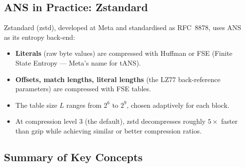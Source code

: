 \subsection{ANS in Practice: Zstandard}

Zstandard (zstd), developed at Meta and standardised as
RFC~8878, uses ANS as its entropy back-end:

\begin{itemize}[leftmargin=2em]
  \item \textbf{Literals} (raw byte values) are compressed
        with Huffman or FSE (Finite State Entropy — Meta's
        name for tANS).
  \item \textbf{Offsets, match lengths, literal lengths}
        (the LZ77 back-reference parameters) are compressed
        with FSE tables.
  \item The table size $L$ ranges from $2^6$ to $2^9$,
        chosen adaptively for each block.
  \item At compression level 3 (the default), zstd
        decompresses roughly $5\times$ faster than gzip
        while achieving similar or better compression ratios.
\end{itemize}

\subsection{Summary of Key Concepts}

